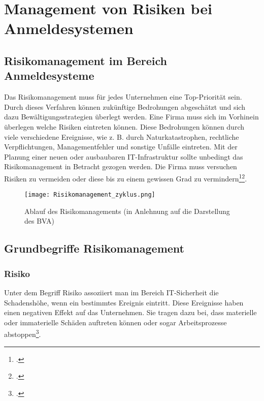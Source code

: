 \chapter{Management von Risiken bei Anmeldesystemen}
\strahlhofer

\section{Risikomanagement im Bereich Anmeldesysteme}
Das Risikomanagement muss für jedes Unternehmen eine Top-Priorität sein. Durch dieses Verfahren können zukünftige Bedrohungen abgeschätzt und sich dazu Bewältigungsstrategien überlegt werden. Eine Firma muss sich im Vorhinein überlegen welche Risiken eintreten können. Diese Bedrohungen können durch viele verschiedene Ereignisse, wie z. B. durch Naturkatastrophen, rechtliche Verpflichtungen, Managementfehler und sonstige Unfälle eintreten.
Mit der Planung einer neuen oder ausbaubaren IT-Infrastruktur sollte unbedingt das Risikomanagement in Betracht gezogen werden. Die Firma muss versuchen Risiken zu vermeiden oder diese bis zu einem gewissen Grad zu vermindern\footcite{risikomanagement-diplomarbeit}\footcite{risikoidentifikation-definition}. 

\begin{center}
\begin{figure}[H]
    \centering
    \texttt{[image: Risikomanagement\_zyklus.png]}
    \caption{Ablauf des Risikomanagements (in Anlehnung auf die Darstellung des BVA)}
\end{figure}
\end{center}


\section{Grundbegriffe Risikomanagement}
\subsection{Risiko}
Unter dem Begriff Risiko assoziiert man im Bereich IT-Sicherheit die Schadenshöhe, wenn ein bestimmtes Ereignis eintritt. Diese Ereignisse haben einen negativen Effekt auf das Unternehmen. Sie tragen dazu bei, dass materielle oder immaterielle Schäden auftreten können oder sogar Arbeitsprozesse abstoppen\footcite{risikomanagement-diplomarbeit}.

